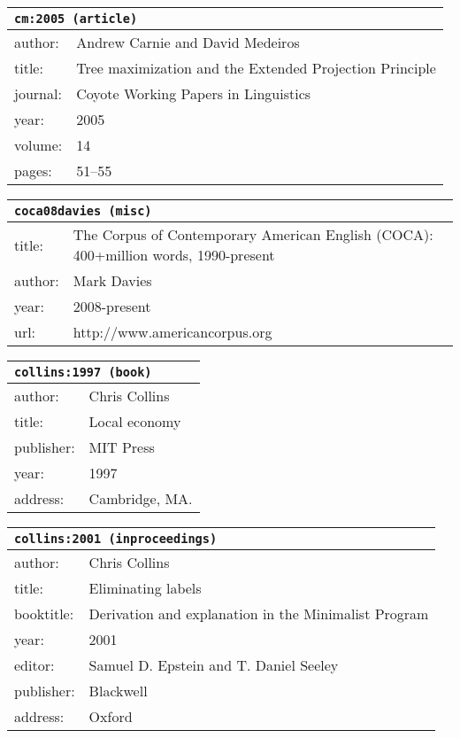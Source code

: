 \documentclass{article}
\begin{document}
\bigskip

\begin{tabular}{p{}p{}}
\multicolumn{2}{l}{\texttt{cm:2005 (article)}}\\
\hline
author: & Andrew Carnie and David Medeiros\\
title: & Tree maximization and the Extended Projection Principle\\
journal: & Coyote Working Papers in Linguistics\\
year: & 2005\\
volume: & 14\\
pages: & 51--55\\
\end{tabular}

\bigskip

\begin{tabular}{p{}p{}}
\multicolumn{2}{l}{\texttt{coca08davies (misc)}}\\
\hline
title: & The \textsc{C}orpus of \textsc{C}ontemporary \textsc{A}merican \textsc{E}nglish (\textsc{COCA}): 400+million words, 1990-present\\
author: & Mark Davies\\
year: & 2008-present\\
url: & http://www.americancorpus.org\\
\end{tabular}

\bigskip

\begin{tabular}{p{}p{}}
\multicolumn{2}{l}{\texttt{collins:1997 (book)}}\\
\hline
author: & Chris Collins\\
title: & Local economy\\
publisher: & MIT Press\\
year: & 1997\\
address: & Cambridge, MA.\\
\end{tabular}

\bigskip

\begin{tabular}{p{}p{}}
\multicolumn{2}{l}{\texttt{collins:2001 (inproceedings)}}\\
\hline
author: & Chris Collins\\
title: & Eliminating labels\\
booktitle: & Derivation and explanation in the Minimalist Program\\
year: & 2001\\
editor: & Samuel D. Epstein and T. Daniel Seeley\\
publisher: & Blackwell\\
address: & Oxford\\
\end{tabular}
\end{document}
